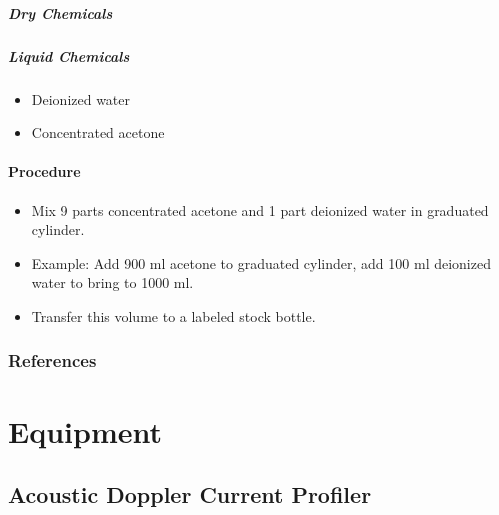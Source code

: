 \documentclass[]{book}
\providecommand{\tightlist}{%
  \setlength{\itemsep}{0pt}\setlength{\parskip}{0pt}}
\let\oldparagraph\paragraph
\renewcommand{\paragraph}[1]{\oldparagraph{#1}\mbox{}}
\theoremstyle{definition}
\theoremstyle{definition}
\theoremstyle{definition}
\theoremstyle{remark}
\begin{document}
\paragraph{Dry Chemicals}\label{dry-chemicals}

\paragraph{Liquid Chemicals}\label{liquid-chemicals}

\begin{itemize}
\tightlist
\item
  Deionized water
\item
  Concentrated acetone
\end{itemize}

\subsubsection*{Procedure}\label{procedure}

\begin{itemize}
\tightlist
\item
  Mix 9 parts concentrated acetone and 1 part deionized water in
  graduated cylinder.
\item
  Example: Add 900 ml acetone to graduated cylinder, add 100 ml
  deionized water to bring to 1000 ml.
\item
  Transfer this volume to a labeled stock bottle.
\end{itemize}

\subsection*{References}\label{references}

\chapter*{Equipment}\label{equipment}

\section*{Acoustic Doppler Current
Profiler}\label{acoustic-doppler-current-profiler}
\end{document}

